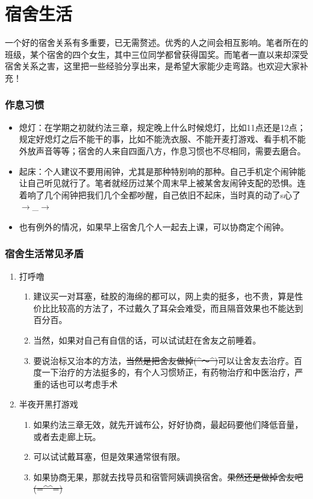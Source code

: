 \documentclass[zihao=-4,fontset=none]{Beautybook-CN}
\begin{document}
\section{宿舍生活}

一个好的宿舍关系有多重要，已无需赘述。优秀的人之间会相互影响。笔者所在的班级，某个宿舍的四个女生，其中三位同学都曾获得国奖。而笔者一直以来却深受宿舍关系之害，这里把一些经验分享出来，是希望大家能少走弯路。也欢迎大家补充！

\subsubsection{作息习惯}
\begin{itemize}
\item 熄灯：在学期之初就约法三章，规定晚上什么时候熄灯，比如11点还是12点；规定好熄灯之后不能干的事，比如不能洗衣服、不能开麦打游戏、看手机不能外放声音等等；宿舍的人来自四面八方，作息习惯也不尽相同，需要去磨合。
\item 起床：个人建议不要用闹钟，尤其是那种特别响的那种。自己手机定个闹钟能让自己听见就行了。笔者就经历过某个周末早上被某舍友闹钟支配的恐惧。连着响了几个闹钟把我们几个全都吵醒，自己依旧不起床，当时真的动了s心了${\rightarrow}$\_${\rightarrow}$
\item 也有例外的情况，如果早上宿舍几个人一起去上课，可以协商定个闹钟。
\end{itemize}
\subsubsection{宿舍生活常见矛盾}
\begin{enumerate}

\item 打呼噜
\begin{enumerate}
    \item 建议买一对耳塞，硅胶的海绵的都可以，网上卖的挺多，也不贵，算是性价比比较高的方法了，不过戴久了耳朵会难受，而且隔音效果也不能达到百分百。

    \item 当然，如果对自己有自信的话，可以试试赶在舍友之前睡着。

    \item 要说治标又治本的方法，\sout{当然是把舍友做掉(\textasciicircum{}～\textasciicircum{})}可以让舍友去治疗。百度一下治疗的方法挺多的，有个人习惯矫正，有药物治疗和中医治疗，严重的话也可以考虑手术
\end{enumerate}

\item 半夜开黑打游戏
\begin{enumerate}
    \item 如果约法三章无效，就先开诚布公，好好协商，最起码要他们降低音量，或者去走廊上玩。

    \item 可以试试戴耳塞，但是效果通常很有限。

    \item 如果协商无果，那就去找导员和宿管阿姨调换宿舍。\sout{果然还是做掉舍友吧(=\textasciicircum{}\textasciicircum{}=)}
\end{enumerate}

\end{enumerate}
\end{document}
